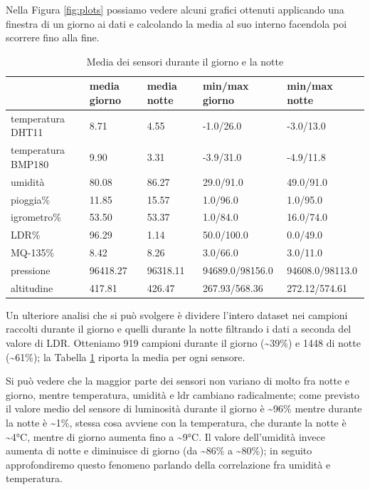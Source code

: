 \documentclass[fleqn, 12pt]{SelfArx}
\begin{document}
Nella Figura \ref{fig:plots} possiamo vedere alcuni grafici ottenuti applicando una finestra di un giorno ai dati e calcolando la media al suo interno facendola poi scorrere fino alla fine.

\begin{table}[htb]
  \centering
  \begin{tabular}{ l l l l l }
    \hline
    & media giorno & media notte & min/max giorno & min/max notte \\
    \hline
    temperatura DHT11 & 8.71 & 4.55 & -1.0/26.0 & -3.0/13.0 \\
    temperatura BMP180 & 9.90 & 3.31 & -3.9/31.0 & -4.9/11.8 \\
    umidità & 80.08 & 86.27 & 29.0/91.0 & 49.0/91.0 \\
    pioggia\% & 11.85 & 15.57 & 1.0/96.0 & 1.0/95.0 \\
    igrometro\% & 53.50 & 53.37 & 1.0/84.0 & 16.0/74.0 \\
    LDR\% & 96.29 & 1.14 & 50.0/100.0 & 0.0/49.0 \\
    MQ-135\% & 8.42 & 8.26 & 3.0/66.0 & 3.0/11.0 \\
    pressione & 96418.27 & 96318.11 & 94689.0/98156.0 & 94608.0/98113.0 \\
    altitudine & 417.81 & 426.47 & 267.93/568.36 & 272.12/574.61 \\
    \hline
  \end{tabular}
  \caption{Media dei sensori durante il giorno e la notte}
  \label{tab:daynight}
\end{table}

Un ulteriore analisi che si può svolgere è dividere l'intero dataset nei campioni raccolti durante il giorno e quelli durante la notte filtrando i dati a seconda del valore di LDR. 
Otteniamo 919 campioni durante il giorno (\textasciitilde39\%) e 1448 di notte (\textasciitilde61\%); la Tabella \ref{tab:daynight} riporta la media per ogni sensore.

Si può vedere che la maggior parte dei sensori non variano di molto fra notte e giorno, mentre temperatura, umidità e ldr cambiano radicalmente; come previsto il valore medio 
del sensore di luminosità durante il giorno è \textasciitilde96\% mentre durante la notte è \textasciitilde1\%, stessa cosa avviene con la temperatura, che durante la notte è \textasciitilde4°C, mentre di 
giorno aumenta fino a \textasciitilde9°C. Il valore dell'umidità invece aumenta di notte e diminuisce di giorno (da \textasciitilde86\% a \textasciitilde80\%); in seguito approfondiremo questo fenomeno parlando 
della correlazione fra umidità e temperatura.
\end{document}
